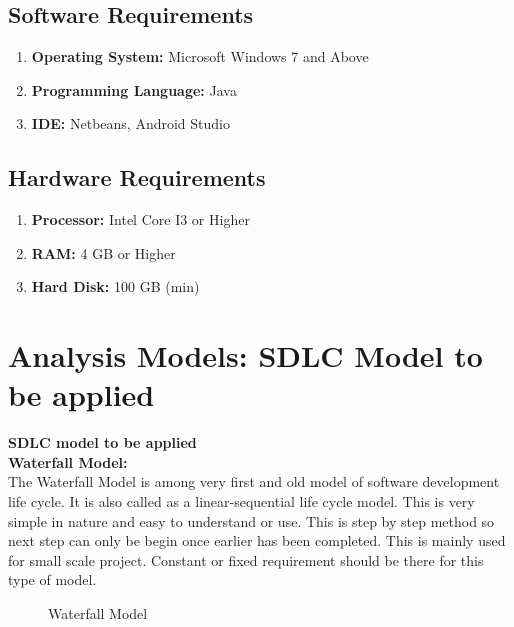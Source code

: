 \documentclass[oneside,a4paper,12pt]{report}
\begin{document}
\subsection{Software Requirements}
\begin{enumerate}
\item \textbf{Operating System: } Microsoft Windows 7 and Above
\item \textbf{Programming Language: } Java
\item \textbf{IDE: } Netbeans, Android Studio
\end{enumerate}
\subsection{Hardware Requirements}
\begin{enumerate}
\item \textbf{Processor: } Intel Core I3 or Higher
\item \textbf{RAM: } 4 GB or Higher
\item \textbf{Hard Disk: } 100 GB (min)
\end{enumerate}

\section{Analysis Models: SDLC Model to be applied}
\textbf{SDLC model to be applied}\\
\textbf{Waterfall Model:}\\
\hspace*{0.5cm} The Waterfall Model is among very first and old model of software development life cycle. It is also called as a linear-sequential life cycle model. This is very simple in nature and easy to understand or use. This is step by step method so next step can only be begin once earlier has been completed. This is mainly used for small scale project. Constant or fixed requirement should be there for this type of model. 

\begin{center}
	\begin{figure}[!htbp]
		\centering
	    \caption{Waterfall Model}
	    \label{fig:Waterfall Model}
	\end{figure}
\end{center}
\end{document}
